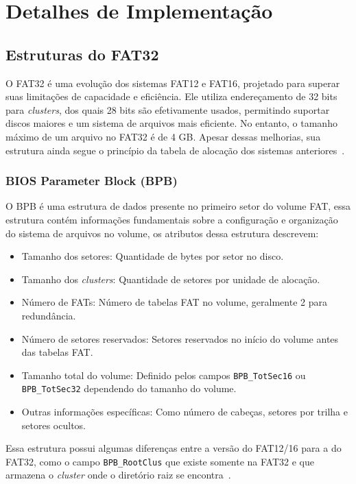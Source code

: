 \documentclass[
    12pt,				%
    oneside,   	        %
    a4paper,			%
    english,			%
    french,				%
    spanish,			%
    brazil,				%
    ]{pacotes/abntex2}
\begin{document}
\section{Detalhes de Implementação}
\label{sec:implementacao}

\subsection{Estruturas do FAT32}
\label{subsec:estrutura_fat}

O FAT32 é uma evolução dos sistemas FAT12 e FAT16, projetado para superar suas limitações de capacidade e eficiência. Ele utiliza endereçamento de 32 bits para \textit{clusters}, dos quais 28 bits são efetivamente usados, permitindo suportar discos maiores e um sistema de arquivos mais eficiente. No entanto, o tamanho máximo de um arquivo no FAT32 é de 4 GB. Apesar dessas melhorias, sua estrutura ainda segue o princípio da tabela de alocação dos sistemas anteriores~\cite{osdev}.

\subsubsection{BIOS Parameter Block (BPB)}
\label{subsubsec:bpb}

O BPB é uma estrutura de dados presente no primeiro setor do volume FAT, essa estrutura contém informações fundamentais sobre a configuração e organização do sistema de arquivos no volume, os atributos dessa estrutura descrevem:

\begin{itemize}
    \item Tamanho dos setores: Quantidade de bytes por setor no disco.
    \item Tamanho dos \textit{clusters}: Quantidade de setores por unidade de alocação.
    \item Número de FATs: Número de tabelas FAT no volume, geralmente 2 para redundância.
    \item Número de setores reservados: Setores reservados no início do volume antes das tabelas FAT.
    \item Tamanho total do volume: Definido pelos campos \texttt{BPB\_TotSec16} ou \texttt{BPB\_TotSec32} dependendo do tamanho do volume.
    \item Outras informações específicas: Como número de cabeças, setores por trilha e setores ocultos.
\end{itemize}

Essa estrutura possui algumas diferenças entre a versão do FAT12/16 para a do FAT32, como o campo \texttt{BPB\_RootClus} que existe somente na FAT32 e que armazena o \textit{cluster} onde o diretório raiz se encontra~\cite{microsoft2000}.
\end{document}

